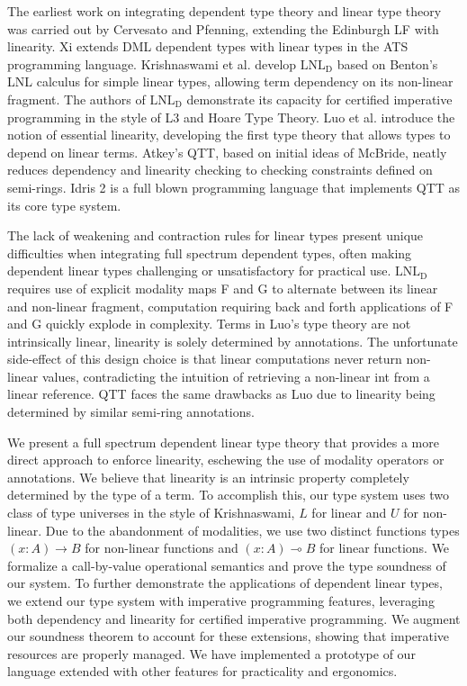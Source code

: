 \documentclass{article}
\newcommand{\LNLD}{\text{LNL}_\text{D}}
\begin{document}
  The earliest work on integrating dependent type theory and linear type theory was carried out by Cervesato and Pfenning, extending the Edinburgh LF with linearity. Xi extends DML dependent types with linear types in the ATS programming language. Krishnaswami et al. develop $\LNLD$ based on Benton's LNL calculus for simple linear types, allowing term dependency on its non-linear fragment. The authors of $\LNLD$ demonstrate its capacity for certified imperative programming in the style of L3 and Hoare Type Theory.  Luo et al. introduce the notion of essential linearity, developing the first type theory that allows types to depend on linear terms. Atkey's QTT, based on initial ideas of McBride, neatly reduces dependency and linearity checking to checking constraints defined on semi-rings. Idris 2 is a full blown programming language that implements QTT as its core type system.

  The lack of weakening and contraction rules for linear types present unique difficulties when integrating full spectrum dependent types, often making dependent linear types challenging or unsatisfactory for practical use. $\LNLD$ requires use of explicit modality maps F and G to alternate between its linear and non-linear fragment, computation requiring back and forth applications of F and G quickly explode in complexity. Terms in Luo's type theory are not intrinsically linear, linearity is solely determined by annotations. The unfortunate side-effect of this design choice is that linear computations never return non-linear values, contradicting the intuition of retrieving a non-linear int from a linear reference. QTT faces the same drawbacks as Luo due to linearity being determined by similar semi-ring annotations.
  
  We present a full spectrum dependent linear type theory that provides a more direct approach to enforce linearity, eschewing the use of modality operators or annotations. We believe that linearity is an intrinsic property completely determined by the type of a term. To accomplish this, our type system uses two class of type universes in the style of Krishnaswami, $L$ for linear and $U$ for non-linear. Due to the abandonment of modalities, we use two distinct functions types $(x : A) \rightarrow B$ for non-linear functions and $(x : A) \multimap B$ for linear functions. We formalize a call-by-value operational semantics and prove the type soundness of our system. To further demonstrate the applications of dependent linear types, we extend our type system with imperative programming features, leveraging both dependency and linearity for certified imperative programming. We augment our soundness theorem to account for these extensions, showing that imperative resources are properly managed. We have implemented a prototype of our language extended with other features for practicality and ergonomics.
\end{document}
